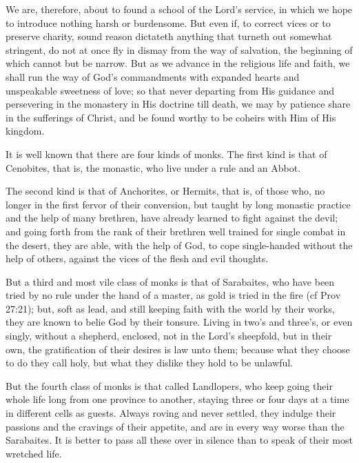 We are, therefore, about to found a school of the Lord's service, in which we hope to introduce nothing harsh or burdensome. But even if, to correct vices or to preserve charity, sound reason dictateth anything that turneth out somewhat stringent, do not at once fly in dismay from the way of salvation, the beginning of which cannot but be narrow. But as we advance in the religious life and faith, we shall run the way of God's commandments with expanded hearts and unspeakable sweetness of love; so that never departing from His guidance and persevering in the monastery in His doctrine till death, we may by patience share in the sufferings of Christ, and be found worthy to be coheirs with Him of His kingdom.


It is well known that there are four kinds of monks. The first kind is that of Cenobites, that is, the monastic, who live under a rule and an Abbot.

The second kind is that of Anchorites, or Hermits, that is, of those who, no longer in the first fervor of their conversion, but taught by long monastic practice and the help of many brethren, have already learned to fight against the devil; and going forth from the rank of their brethren well trained for single combat in the desert, they are able, with the help of God, to cope single-handed without the help of others, against the vices of the flesh and evil thoughts.

But a third and most vile class of monks is that of Sarabaites, who have been tried by no rule under the hand of a master, as gold is tried in the fire (cf Prov 27:21); but, soft as lead, and still keeping faith with the world by their works, they are known to belie God by their tonsure. Living in two's and three's, or even singly, without a shepherd, enclosed, not in the Lord's sheepfold, but in their own, the gratification of their desires is law unto them; because what they choose to do they call holy, but what they dislike they hold to be unlawful.

But the fourth class of monks is that called Landlopers, who keep going their whole life long from one province to another, staying three or four days at a time in different cells as guests. Always roving and never settled, they indulge their passions and the cravings of their appetite, and are in every way worse than the Sarabaites. It is better to pass all these over in silence than to speak of their most wretched life.

